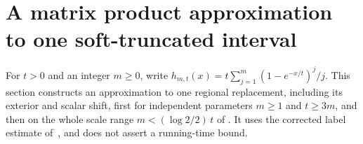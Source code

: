 \section{A matrix product approximation to one soft-truncated interval}
\label{sec:soft_interval_mpo}

For $t>0$ and an integer $m\geq0$, write
$h_{m,t}(x)=t\sum_{j=1}^m(1-e^{-x/t})^j/j$.
This section constructs an approximation to one regional replacement,
including its exterior and scalar shift, first for independent parameters
$m\geq1$ and $t\geq3m$, and then on the whole scale range
$m<(\log2/2)\,t$ of \cite[lines 1262--1268]{Arad2016RigorousRG}.
It uses the corrected label estimate of~\cite{gap:alvv16_cluster_approximation},
and does not assert a running-time bound.


